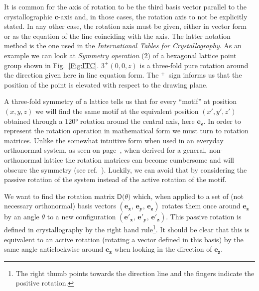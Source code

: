 It is common for the axis of rotation to be the third basis vector \ie parallel to the crystallographic $\mathbf{c}$-axis and, in those cases, the rotation axis to not be explicitly stated. In any other case, the rotation axis must be given, either in vector form \hkl[uvw] or as the equation of the line coinciding with the axis. The latter notation method is the one used in the \textit{International Tables for Crystallography}. As an example we can look at \textit{Symmetry operation} (2) of a hexagonal lattice point group shown in Fig.~\ref{Fig:ITC}. $3^+(0,0,z)$ is a three-fold pure rotation around the \hkl[001] direction given here in line equation form. The $^+$~sign informs us that the position of the point is elevated with respect to the drawing plane. 

A three-fold symmetry of a lattice tells us that for every ``motif'' at position $(x, y, z)$ we will find the same motif at the equivalent position $(x', y', z')$ obtained through a $120\si{\degree}$ rotation around the central axis, here $\mathbf{e_z}$.  In order to represent the rotation operation in mathematical form we must turn to rotation matrices. Unlike the somewhat intuitive form when used in an everyday orthonormal system, as seen on page~\pageref{eq:RotMat}, when derived for a general, non-orthonormal lattice the rotation matrices can become cumbersome and will obscure the symmetry (see ref.~\cite{Davenport73}). Luckily, we can avoid that by considering the passive rotation of the system instead of the active rotation of the motif. 

We want to find the rotation matrix $\mathsf{D(}\theta\mathsf{)}$ which, when applied to a set of (not necessary orthonormal) basis vectors $(\mathbf{e_x},\, \mathbf{e_y},\, \mathbf{e_z})$ rotates them once around $\mathbf{e_z}$ by an angle $\theta$ to a new configuration $(\mathbf{e'_x},\, \mathbf{e'_y},\, \mathbf{e'_z})$. This passive rotation is defined in crystallography by the right hand rule\footnote{ The right thumb points towards the direction line and the fingers indicate the positive rotation.}. It should be clear that this is equivalent to an active rotation (\ie rotating a vector defined in this basis) by the same angle anticlockwise around $\mathbf{e_z}$ when looking in the direction of $\mathbf{e_z}$. 

\vspace{0.3cm}

